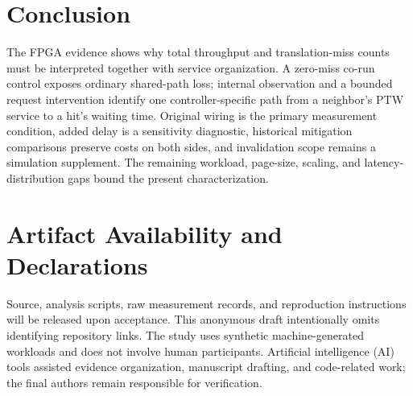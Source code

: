 \section{Conclusion}
The FPGA evidence shows why total throughput and translation-miss counts must be interpreted together with service organization. A zero-miss co-run control exposes ordinary shared-path loss; internal observation and a bounded request intervention identify one controller-specific path from a neighbor's PTW service to a hit's waiting time. Original wiring is the primary measurement condition, added delay is a sensitivity diagnostic, historical mitigation comparisons preserve costs on both sides, and invalidation scope remains a simulation supplement. The remaining workload, page-size, scaling, and latency-distribution gaps bound the present characterization.

\section*{Artifact Availability and Declarations}
Source, analysis scripts, raw measurement records, and reproduction instructions will be released upon acceptance. This anonymous draft intentionally omits identifying repository links. The study uses synthetic machine-generated workloads and does not involve human participants. Artificial intelligence (AI) tools assisted evidence organization, manuscript drafting, and code-related work; the final authors remain responsible for verification.
